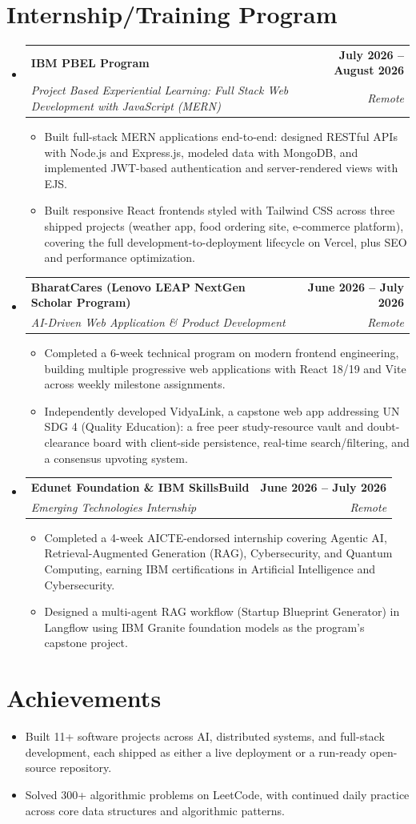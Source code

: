 \documentclass[letterpaper,10pt]{article}
\makeatletter
\newcommand{\resumeItem}[1]{
  \item\small{
    {#1 \vspace{-2pt}}
  }
}
\newcommand{\resumeSubheading}[4]{
  \vspace{-2pt}\item
    \begin{tabular*}{1.0\textwidth}[t]{l@{\extracolsep{\fill}}r}
      \textbf{#1} & \textbf{\small #2} \\
      \textit{\small#3} & \textit{\small #4} \\
    \end{tabular*}\vspace{-7pt}
}
\newcommand{\resumeSubHeadingListStart}{\begin{itemize}[leftmargin=0.0in, label={}]}
\newcommand{\resumeSubHeadingListEnd}{\end{itemize}}
\newcommand{\resumeItemListStart}{\begin{itemize}}
\newcommand{\resumeItemListEnd}{\end{itemize}\vspace{-5pt}}
\makeatother
\begin{document}
\section{Internship/Training Program}
  \resumeSubHeadingListStart
    \resumeSubheading
      {IBM PBEL Program}{July 2026 -- August 2026}
      {Project Based Experiential Learning: Full Stack Web Development with JavaScript (MERN)}{Remote}
      \resumeItemListStart
        \resumeItem{Built full-stack MERN applications end-to-end: designed RESTful APIs with Node.js and Express.js, modeled data with MongoDB, and implemented JWT-based authentication and server-rendered views with EJS.}
        \resumeItem{Built responsive React frontends styled with Tailwind CSS across three shipped projects (weather app, food ordering site, e-commerce platform), covering the full development-to-deployment lifecycle on Vercel, plus SEO and performance optimization.}
      \resumeItemListEnd
    \resumeSubheading
      {BharatCares (Lenovo LEAP NextGen Scholar Program)}{June 2026 -- July 2026}
      {AI-Driven Web Application \& Product Development}{Remote}
      \resumeItemListStart
        \resumeItem{Completed a 6-week technical program on modern frontend engineering, building multiple progressive web applications with React 18/19 and Vite across weekly milestone assignments.}
        \resumeItem{Independently developed VidyaLink, a capstone web app addressing UN SDG 4 (Quality Education): a free peer study-resource vault and doubt-clearance board with client-side persistence, real-time search/filtering, and a consensus upvoting system.}
      \resumeItemListEnd
    \resumeSubheading
      {Edunet Foundation \& IBM SkillsBuild}{June 2026 -- July 2026}
      {Emerging Technologies Internship}{Remote}
      \resumeItemListStart
        \resumeItem{Completed a 4-week AICTE-endorsed internship covering Agentic AI, Retrieval-Augmented Generation (RAG), Cybersecurity, and Quantum Computing, earning IBM certifications in Artificial Intelligence and Cybersecurity.}
        \resumeItem{Designed a multi-agent RAG workflow (Startup Blueprint Generator) in Langflow using IBM Granite foundation models as the program's capstone project.}
      \resumeItemListEnd
  \resumeSubHeadingListEnd
\vspace{-12pt}

\section{Achievements}
      \resumeItemListStart
\resumeItem{Built 11+ software projects across AI, distributed systems, and full-stack development, each shipped as either a live deployment or a run-ready open-source repository.}
  \vspace{-16pt}
\resumeItem{Solved 300+ algorithmic problems on LeetCode, with continued daily practice across core data structures and algorithmic patterns.}
     \resumeItemListEnd
\end{document}
